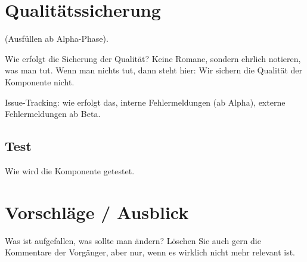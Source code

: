 \section{Qualitätssicherung}
(Ausfüllen ab Alpha-Phase).

Wie erfolgt die Sicherung der Qualität? Keine Romane, sondern ehrlich notieren,
was man tut. Wenn man nichts tut, dann steht hier: Wir sichern die Qualität der
Komponente nicht.

Issue-Tracking: wie erfolgt das, interne Fehlermeldungen (ab Alpha), 
externe Fehlermeldungen ab Beta.

\subsection{Test}
Wie wird die Komponente getestet.

\section{Vorschläge / Ausblick}
Was ist aufgefallen, was sollte man ändern? Löschen Sie auch gern die Kommentare
der Vorgänger, aber nur, wenn es wirklich nicht mehr relevant ist.

